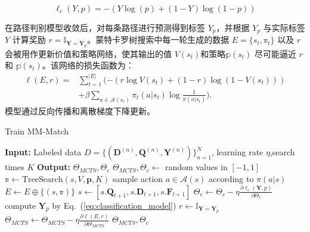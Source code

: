 \begin{equation}
\label{eq:classification_loss}
\ell_c(Y, p) = -\left(Y\log(p) + (1-Y)\log (1-p)\right)
\end{equation}

在路径判别模型收敛后，对每条路径进行预测得到标签 $Y_p$，并根据 $Y_p$ 与实际标签 $Y$ 计算奖励 $r= \mathbb{I}_{\mathbf{Y} = \mathbf{Y}_p}$。蒙特卡罗树搜索中每一轮生成的数据 $E=\{s_t, \mathbb{\pi}_t\}$ 以及 $r$ 会被用作更新价值和策略网络，使其输出的值 $V(s_t)$和策略$\mathbb{p}(s_t)$ 尽可能逼近 $r$ 和 $\mathbb{p}(s_t)$。该网络的损失函数为：
\begin{equation}
\label{eq:loss}
\begin{aligned}
  \ell(E, r) = &\sum_{t=1}^{|E|} (-(r\log V(s_t) + (1-r)\log (1-V(s_t)))  \\
  &+ \beta\sum_{a\in\mathcal{A}(s_t)}\pi_t(a|s_t) \log \frac{1}{\pi(a|s_t)}).
\end{aligned}
\end{equation}
模型通过反向传播和离散梯度下降更新。

\begin{algorithm}[!htbp]
\caption{Train MM-Match}\label{alg:Train}

\begin{algorithmic}[1]
\STATE \textbf{Input:} Labeled data $D=\{ (\mathbf{D}^{(n)}, \mathbf{Q}^{(n)}, \mathbf{Y}^{(n)})\}_{n=1}^N$, learning rate $\eta$,search times $K$
\STATE \textbf{Output:} $\Theta_{MCTS}, \Theta_{c}$
\STATE {} $\Theta_{MCTS}, \Theta_{c} \leftarrow$ random values in $[-1, 1]$
\REPEAT
            \STATE $\mathbb{\pi} \leftarrow \mathrm{TreeSearch}(s, V, \mathbf{p}, K)$ 
      \STATE sample action ${a\in\mathcal{A}(s)}$ according to $\pi(a|s)$
      \STATE $E\leftarrow E \oplus \{(s, \mathbb{\pi})\}$
      \STATE $s \leftarrow [s.\mathbf{Q}_{t+1}, s.\mathbf{D}_{t+1}, s.\mathbf{F}_{t+1}]$
    \ENDWHILE
    \STATE $\Theta_{c} \leftarrow \Theta_{c} - \eta \frac{\partial \ell_c(\mathbf{Y}, p)}{\partial \Theta_{c}}$  
    \ENDWHILE
    \STATE compute $\mathbf{Y}_p$ by Eq.~(\ref{eq:classification_model})
    \STATE $r \leftarrow \mathbb{I}_{\mathbf{Y} = \mathbf{Y}_p}$
    \STATE $\Theta_{MCTS} \leftarrow \Theta_{MCTS} -\eta \frac{\partial \ell(E, r)}{\partial \Theta_{MCTS}}$ 
  \ENDFOR
{}
\STATE\RETURN $\Theta_{MCTS}, \Theta_{c}$
\end{algorithmic}
\end{algorithm}


